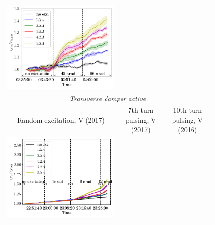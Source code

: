 \documentclass[aps
,prstab
,reprint
,longbibliography
,preprintnumbers
,showkeys
,amsfonts,amssymb,amsmath
,floatfix
]{revtex4-1}
\newcommand{\seventhtp}{7th-turn pulsing}
\newcommand{\tenthtp}{10th-turn pulsing}
\newlength{\thirdwidth}
\begin{document}
\begin{figure}
\begin{tabular}{ccc}
    \includegraphics[width=\thirdwidth]{2016_emitv_avg_rel_v10th_no_damper_no_text.png}\\
    \multicolumn{3}{c}{\emph{Transverse damper active}} \\
    Random excitation, V (2017) & \seventhtp, V (2017) & \tenthtp, V
                                                         (2016) \\
    \includegraphics[width=\thirdwidth]{2017_emitv_avg_rel_vran_with_damper.png} &

\end{tabular}
\end{figure}
\end{document}
